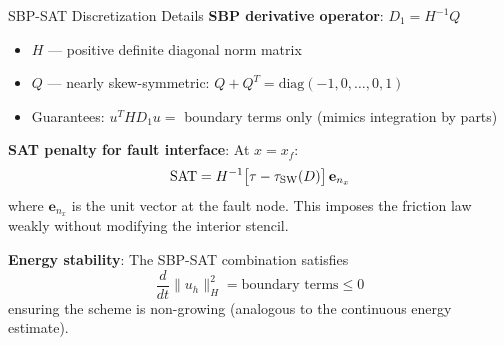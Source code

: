 \documentclass[aspectratio=169,12pt]{beamer}
\begin{document}
\begin{frame}{SBP-SAT Discretization Details}
  \textbf{SBP derivative operator}: $D_1 = H^{-1} Q$
  \begin{itemize}
    \item $H$ — positive definite diagonal norm matrix
    \item $Q$ — nearly skew-symmetric: $Q + Q^T = \text{diag}(-1,0,\ldots,0,1)$
    \item Guarantees: $u^T H D_1 u = $ boundary terms only (mimics integration by parts)
  \end{itemize}

  \vspace{8pt}
  \textbf{SAT penalty for fault interface}: At $x = x_f$:
  \[
    \text{SAT} = H^{-1}\bigl[\tau - \tau_{\rm SW}(D)\bigr]\,\mathbf{e}_{n_x}
  \]
  where $\mathbf{e}_{n_x}$ is the unit vector at the fault node. This imposes the friction law weakly without modifying the interior stencil.

  \vspace{4pt}
  \textbf{Energy stability}: The SBP-SAT combination satisfies
  \[
    \frac{d}{dt}\|u_h\|_{H}^2 = \text{boundary terms} \le 0
  \]
  ensuring the scheme is non-growing (analogous to the continuous energy estimate).
\end{frame}
\end{document}
